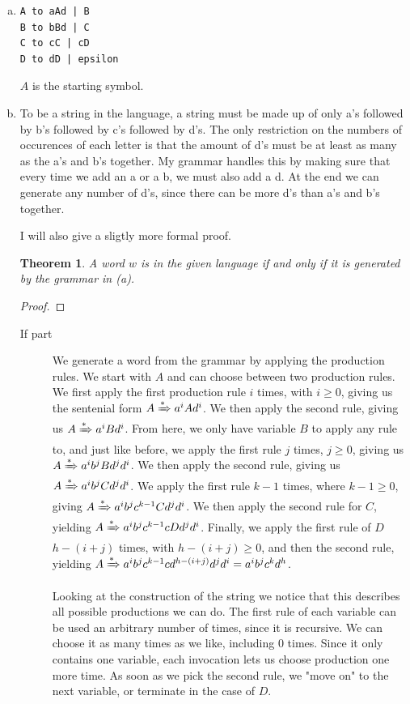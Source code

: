 \documentclass{article}
\newtheorem{theorem}{Theorem}[section]
\begin{document}
\begin{enumerate}[(a)]
    \item 
\begin{lstlisting}
A to aAd | B 
B to bBd | C 
C to cC | cD 
D to dD | epsilon
\end{lstlisting}

$A$ is the starting symbol.

    \item 
        To be a string in the language, a string must be made up of only a's followed by b's followed by c's followed by d's. The only restriction on the numbers of occurences of each letter is that the amount of d's must be at least as many as the a's and b's together. My grammar handles this by making sure that every time we add an a or a b, we must also add a d. At the end we can generate any number of d's, since there can be more d's than a's and b's together.

        I will also give a sligtly more formal proof.

    \begin{theorem} A word $w$ is in the given language if and only if it is generated by the grammar in (a).\end{theorem}
        \begin{proof}
        \end{proof}
        \begin{description}
            \item[If part] We generate a word from the grammar by applying the production rules. We start with $A$ and can choose between two production rules. We first apply the first production rule $i$ times, with $i \geq 0$, giving us the sentenial form $A \xRightarrow{*} a^iAd^i$. We then apply the second rule, giving us $A \xRightarrow{*} a^iBd^i$. From here, we only have variable $B$ to apply any rule to, and just like before, we apply the first rule $j$ times, $j \geq 0$, giving us $A \xRightarrow{*} a^ib^jBd^jd^i$. We then apply the second rule, giving us $A \xRightarrow{*} a^ib^jCd^jd^i$. We apply the first rule $k-1$ times, where $k-1 \geq 0$, giving $A \xRightarrow{*} a^ib^jc^{k-1}Cd^jd^i$. We then apply the second rule for $C$, yielding $A \xRightarrow{*} a^ib^jc^{k-1}cDd^jd^i$. Finally, we apply the first rule of $D$ $h - (i + j)$ times, with $h-(i+j) \geq 0$, and then the second rule, yielding $A \xRightarrow{*} a^ib^jc^{k-1}cd^{h-(i+j)}d^jd^i = a^ib^jc^kd^h$. 

                Looking at the construction of the string we notice that this describes all possible productions we can do. The first rule of each variable can be used an arbitrary number of times, since it is recursive. We can choose it as many times as we like, including 0 times. Since it only contains one variable, each invocation lets us choose production one more time. As soon as we pick the second rule, we "move on" to the next variable, or terminate in the case of $D$.


\end{description}
\end{enumerate}
\end{document}
